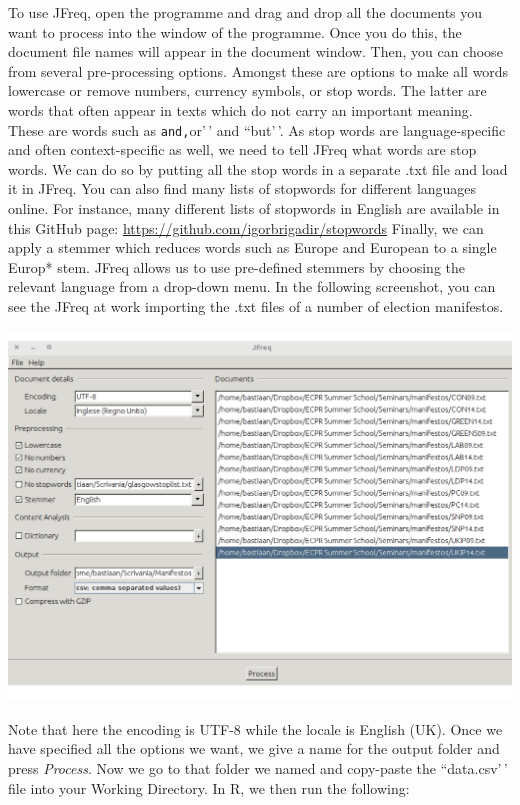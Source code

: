 \documentclass[
]{book}
\begin{document}
To use JFreq, open the programme and drag and drop all the documents you want to process into the window of the programme. Once you do this, the document file names will appear in the document window. Then, you can choose from several pre-processing options. Amongst these are options to make all words lowercase or remove numbers, currency symbols, or stop words. The latter are words that often appear in texts which do not carry an important meaning. These are words such as \texttt{and\textquotesingle{}\textquotesingle{},}or'\,' and ``but'\,'. As stop words are language-specific and often context-specific as well, we need to tell JFreq what words are stop words. We can do so by putting all the stop words in a separate .txt file and load it in JFreq. You can also find many lists of stopwords for different languages online. For instance, many different lists of stopwords in English are available in this GitHub page: \url{https://github.com/igorbrigadir/stopwords} Finally, we can apply a stemmer which reduces words such as Europe and European to a single Europ* stem. JFreq allows us to use pre-defined stemmers by choosing the relevant language from a drop-down menu. In the following screenshot, you can see the JFreq at work importing the .txt files of a number of election manifestos.

\begin{center}\includegraphics[width=0.75\linewidth]{figures/jfreq} \end{center}

Note that here the encoding is UTF-8 while the locale is English (UK). Once we have specified all the options we want, we give a name for the output folder and press \emph{Process}. Now we go to that folder we named and copy-paste the ``data.csv'\,' file into your Working Directory. In R, we then run the following:
\end{document}

